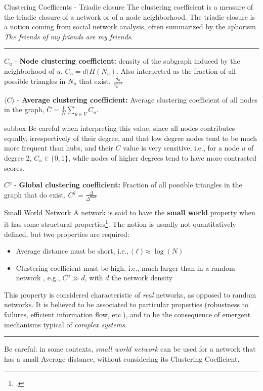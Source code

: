 \begin{textbox}{Clustering Coefficents - Triadic closure}
    The clustering coefficient is a measure of the triadic closure of a network or of a node neighborhood. The triadic closure is a notion coming from social network analysis, often summarized by the aphorism \textit{The friends of my friends are my friends}.

    \noindent\rule{4cm}{0.1pt}


    $C_u$ - \textbf{Node clustering coefficient:} density of the subgraph induced by the neighborhood of $u$, $C_u = d(H(N_u)$. Also interpreted as the fraction of all possible triangles in $N_u$ that exist, $\frac{\delta_u}{\delta^{\max}_u}$

    $\langle C \rangle$ - \textbf{Average clustering coefficient:} Average clustering coefficient of all nodes in the graph, $\bar C = \frac{1}{N}\sum_{u \in V} C_u$.\\

    \begin{subbox}{subbox}{}
        \tiny{Be careful when interpreting this value, since all nodes contributes equally, irrespectively of their degree, and that low degree nodes tend to be much more frequent than hubs, and their $C$ value is very sensitive, i.e., for a node $u$ of degree 2, $C_u \in \{0,1\}$, while nodes of higher degrees tend to have more contrasted scores.}
    \end{subbox}

    $C^g$ - \textbf{Global clustering coefficient:} Fraction of all possible triangles in the graph that do exist, $C^g= \frac{\Delta}{\Delta^{\max}} $

\end{textbox}

\begin{textbox}{Small World Network}
    A network is said to have the \textbf{small world} property when it has some structural properties\footcite{watts1998collective}. The notion is usually not quantitatively defined, but two properties are required:
    \begin{itemize}
        \item Average distance must be short, i.e., $\langle\ell\rangle \approx \log(N)$
        \item Clustering coefficient must be high, i.e., much larger than in a random network , e.g., $C^g \gg d$, with $d$ the network density
    \end{itemize}

    This property is considered characteristic of \textit{real} networks, as opposed to random networks. It is believed to be associated to particular properties (robustness to failures, efficient information flow, etc.), and to be the consequence of emergent mechanisms typical of \textit{complex systems}.

    \noindent\rule{4cm}{0.1pt}

    Be careful: in some contexts, \textit{small world network} can be used for a network that has a small Average distance, without considering its Clustering Coefficient.
\end{textbox}

